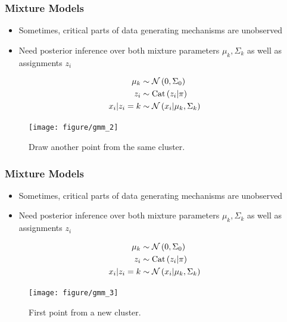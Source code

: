 \documentclass[10pt,mathserif]{beamer}
\begin{document}
\label{sec:latent_variable_models}
\begin{frame}
  \frametitle{Mixture Models}
  \begin{itemize}
  \item Sometimes, critical parts of data generating mechanisms are unobserved
    \item Need posterior inference over both mixture parameters $\mu_k,
      \Sigma_k$ as well as assignments $z_i$
  \end{itemize}
  \begin{align*}
    \mu_{k} &\sim \mathcal{N}\left(0, \Sigma_{0}\right) \\
    z_i &\sim \textnormal{Cat}\left(z_i \vert \pi\right) \\
    x_i \vert z_i = k &\sim \mathcal{N}\left(x_i \vert \mu_{k}, \Sigma_k\right)
  \end{align*}
\begin{figure}[ht]
  \centering
  \texttt{[image: figure/gmm\_2]}
  \caption{Draw another point from the same cluster.
    \label{fig:gmm_2} }
\end{figure}
\end{frame}

\label{sec:latent_variable_models}
\begin{frame}
  \frametitle{Mixture Models}
  \begin{itemize}
  \item Sometimes, critical parts of data generating mechanisms are unobserved
    \item Need posterior inference over both mixture parameters $\mu_k,
      \Sigma_k$ as well as assignments $z_i$
  \end{itemize}
  \begin{align*}
    \mu_{k} &\sim \mathcal{N}\left(0, \Sigma_{0}\right) \\
    z_i &\sim \textnormal{Cat}\left(z_i \vert \pi\right) \\
    x_i \vert z_i = k &\sim \mathcal{N}\left(x_i \vert \mu_{k}, \Sigma_k\right)
  \end{align*}
\begin{figure}[ht]
  \centering
  \texttt{[image: figure/gmm\_3]}
  \caption{First point from a new cluster. \label{fig:gmm_3}}
\end{figure}
\end{frame}
\end{document}
